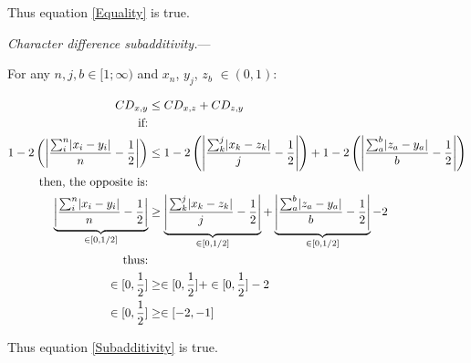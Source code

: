 \documentclass[12pt,letterpaper]{article}
\DeclarePairedDelimiter\abs{\lvert}{\rvert}%
\renewcommand{\subsection}[1]{%
\bigskip
\begin{center}
\begin{large}
\normalfont\itshape #1
\end{large}
\end{center}}
\renewcommand{\subsection}[1]{%
\vspace{2ex}
\noindent
\textit{#1.}---}
\begin{document}
Thus equation \ref{Equality} is true.

\subsection{Character difference subadditivity}

For any $n, j, b \in [1;\infty)$ and $x_{n}$, $y_{j}$, $z_{b}$ $\in (0,1)$:

\begin{equation}
    \label{subadditivity_demo}
    \begin{aligned}
    CD_{x,y} &\leq CD_{x,z} + CD_{z,y}\\
    \text{if:}\\
     1 - 2\left(\abs*{\frac{\sum_{i}^{n}\abs{x_{i}-y_{i}}}{n}-\frac{1}{2}}\right)
     &\leq 
     1 - 2\left(\abs*{\frac{\sum_{k}^{j}\abs{x_{k}-z_{k}}}{j}-\frac{1}{2}}\right) 
     +
     1 - 2\left(\abs*{\frac{\sum_{a}^{b}\abs{z_{a}-y_{a}}}{b}-\frac{1}{2}}\right) \\
     \text{then, the opposite is:}\\
     \underbrace{\abs*{\frac{\sum_{i}^{n}\abs{x_{i}-y_{i}}}{n}-\frac{1}{2}} }_{\in[0,1/2]}
     &\geq 
     \underbrace{\abs*{\frac{\sum_{k}^{j}\abs{x_{k}-z_{k}}}{j}-\frac{1}{2}} }_{\in[0,1/2]}
     +
     \underbrace{\abs*{\frac{\sum_{a}^{b}\abs{z_{a}-y_{a}}}{b}-\frac{1}{2}} }_{\in[0,1/2]} - 2\\
     \text{thus:}\\
     \in[0,\frac{1}{2}] &\geq \in[0,\frac{1}{2}] + \in[0,\frac{1}{2}] -2 \\
     \in[0,\frac{1}{2}] &\geq \in[-2,-1]\\
    \end{aligned}
\end{equation}

Thus equation \ref{Subadditivity} is true.
\end{document}
